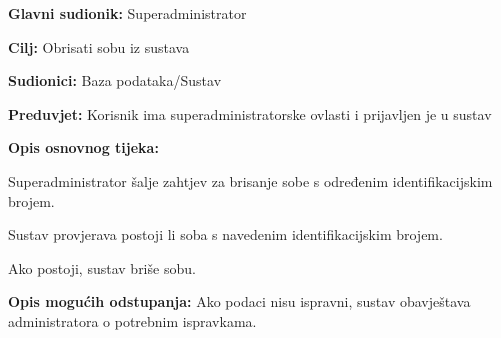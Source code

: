                 \noindent {}
					\begin{packed_item}
	
						\item \textbf{Glavni sudionik: }Superadministrator
						\item  \textbf{Cilj:} Obrisati sobu iz sustava
						\item  \textbf{Sudionici:} Baza podataka/Sustav
						\item  \textbf{Preduvjet:} Korisnik ima superadministratorske ovlasti i prijavljen je u sustav
						\item  \textbf{Opis osnovnog tijeka:}
						
						\item[] \begin{packed_enum}
	
							\item Superadministrator šalje zahtjev za brisanje sobe s određenim identifikacijskim brojem.
							\item Sustav provjerava postoji li soba s navedenim identifikacijskim brojem.
                            \item Ako postoji, sustav briše sobu.
	
						\end{packed_enum}
						
						\item  \textbf{Opis mogućih odstupanja:} Ako podaci nisu ispravni, sustav obavještava administratora o potrebnim ispravkama.
						
						
					\end{packed_item}

